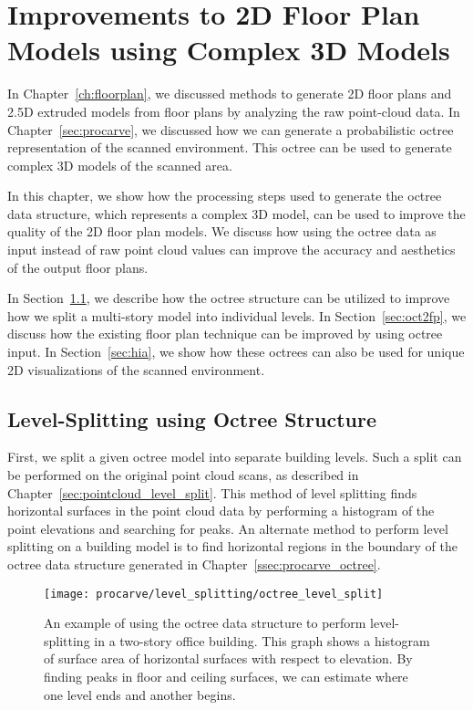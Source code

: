 \documentclass[12pt,onecolumn,oneside]{book}
\begin{document}
\chapter{Improvements to 2D Floor Plan Models using Complex 3D Models}
\label{ch:better_floorplans}

In Chapter~\ref{ch:floorplan}, we discussed methods to generate 2D floor plans and 2.5D extruded models from floor plans by analyzing the raw point-cloud data.  In Chapter~\ref{sec:procarve}, we discussed how we can generate a probabilistic octree representation of the scanned environment.  This octree can be used to generate complex 3D models of the scanned area.

In this chapter, we show how the processing steps used to generate the octree data structure, which represents a complex 3D model, can be used to improve the quality of the 2D floor plan models.  We discuss how using the octree data as input instead of raw point cloud values can improve the accuracy and aesthetics of the output floor plans.

In Section~\ref{sec:octree_level_split}, we describe how the octree structure can be utilized to improve how we split a multi-story model into individual levels.  In Section~\ref{sec:oct2fp}, we discuss how the existing floor plan technique can be improved by using octree input.  In Section~\ref{sec:hia}, we show how these octrees can also be used for unique 2D visualizations of the scanned environment.

\section{Level-Splitting using Octree Structure}
\label{sec:octree_level_split}

First, we split a given octree model into separate building levels.  Such a split can be performed on the original point cloud scans, as described in Chapter~\ref{sec:pointcloud_level_split}.  This method of level splitting finds horizontal surfaces in the point cloud data by performing a histogram of the point elevations and searching for peaks.  An alternate method to perform level splitting on a building model is to find horizontal regions in the boundary of the octree data structure generated in Chapter~\ref{ssec:procarve_octree}.  

\begin{figure}[t]
	\centerline{\texttt{[image: procarve/level\_splitting/octree\_level\_split]}}

	\caption[Using octree to find levels of two-story dataset.]{An example of using the octree data structure to perform level-splitting in a two-story office building.  This graph shows a histogram of surface area of horizontal surfaces with respect to elevation.  By finding peaks in floor and ceiling surfaces, we can estimate where one level ends and another begins.}
	\label{fig:octree_level_split}
\end{figure}
\end{document}
